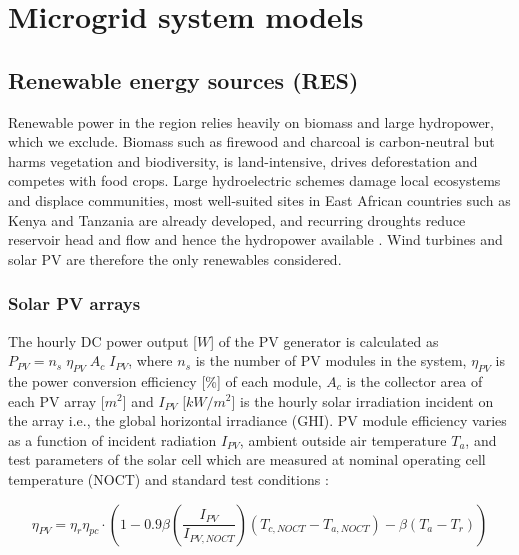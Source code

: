 \documentclass[final,3p,times]{elsarticle}
\begin{document}
\newpage

\appendix
{}

\section{Microgrid system models \label{app:mg_models}}

\subsection{Renewable energy sources (RES)}

Renewable power in the region relies heavily on biomass and large hydropower, which we exclude. Biomass such as firewood and charcoal is carbon-neutral but harms vegetation and biodiversity, is land-intensive, drives deforestation and competes with food crops. Large hydroelectric schemes damage local ecosystems and displace communities, most well-suited sites in East African countries such as Kenya and Tanzania are already developed, and recurring droughts reduce reservoir head and flow and hence the hydropower available \cite{usea}. Wind turbines and solar PV are therefore the only renewables considered.

\subsubsection{Solar PV arrays}

The hourly DC power output [$W$] of the PV generator is calculated as $P_{PV} = n_s \; \eta_{PV} \; A_c \; I_{PV} $\cite{tazvinga2013}, where $n_s$ is the number of PV modules in the system, $\eta_{PV}$ is the power conversion efficiency [\%] of each module, $A_c$ is the collector area of each PV array [$m^2$] and $I_{PV}$ [$kW/m^2$] is the hourly solar irradiation incident on the array i.e., the global horizontal irradiance (GHI). PV module efficiency varies as a function of incident radiation $I_{PV}$, ambient outside air temperature $T_a$, and test parameters of the solar cell which are measured at nominal operating cell temperature (NOCT) and standard test conditions \cite{tazvinga2013}:

\begin{equation}
\label{eq:pv2}
    \eta_{PV} = \eta_r \eta_{pc} \cdot \left(1 - 0.9 \beta \left(\frac{I_{PV}}{I_{PV,NOCT}}\right)(T_{c,NOCT} - T_{a,NOCT}) -\beta(T_a - T_r)\right)
\end{equation}
\end{document}
